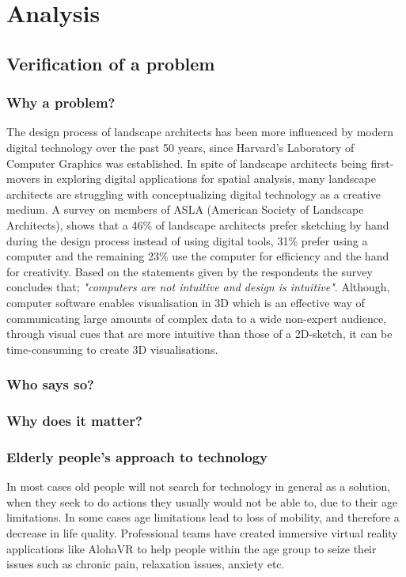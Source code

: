 \chapter{Analysis}
	
	
	\section{Verification of a problem}\label{sec:verification}
		
 		\subsection{Why a problem?}
 		The design process of landscape architects has been more influenced by modern digital technology over the past 50 years, since Harvard's Laboratory of Computer Graphics was established.\cite{landscapeArchitectureDigiTech} In spite of landscape architects being first-movers in exploring digital applications for spatial analysis, many landscape architects are struggling with conceptualizing digital technology as a creative medium\cite{landscapeArchitectureDigiTech}. A survey on members of ASLA (American Society of Landscape Architects)\cite{surveySketchVSDigital}, shows that a 46\% of landscape architects prefer sketching by hand during the design process instead of using digital tools, 31\% prefer using a computer and the remaining 23\% use the computer for efficiency and the hand for creativity. Based on the statements given by the respondents the survey concludes that; \textit{"computers are not intuitive and design is intuitive"}\cite{landscapeArchitectureDigiTech}\cite{surveySketchVSDigital}. Although, computer software enables visualisation in 3D which is an effective way of communicating large amounts of complex data to a wide non-expert audience, through visual cues that are more intuitive than those of a 2D-sketch, it can be time-consuming to create 3D visualisations.\cite{landscapeVisual}
 		

		\subsection{Who says so?}
		
		\subsection{Why does it matter?}
		
		\subsection{Elderly people's approach to technology}
		In most cases old people will not search for technology in general as a solution, when they seek to do actions they usually would not be able to, due to their age limitations. In some cases age limitations lead to loss of mobility, and therefore a decrease in life quality. Professional teams have created immersive virtual reality applications like AlohaVR \cite{elderlyVRScout} to help people within the age group to seize their issues such as chronic pain, relaxation issues, anxiety etc. \\
		
